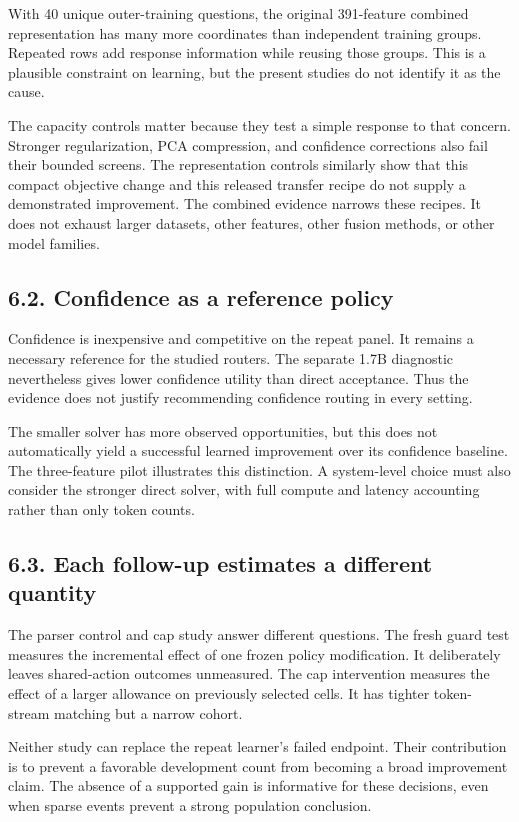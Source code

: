\documentclass[11pt,a4paper]{article}
\begin{document}
With 40 unique outer-training questions, the original 391-feature combined representation has many more coordinates than independent training groups. Repeated rows add response information while reusing those groups. This is a plausible constraint on learning, but the present studies do not identify it as the cause.

The capacity controls matter because they test a simple response to that concern. Stronger regularization, PCA compression, and confidence corrections also fail their bounded screens. The representation controls similarly show that this compact objective change and this released transfer recipe do not supply a demonstrated improvement. The combined evidence narrows these recipes. It does not exhaust larger datasets, other features, other fusion methods, or other model families.

\subsection*{6.2. Confidence as a reference policy}\label{sec:62-confidence-as-a-reference-policy}
Confidence is inexpensive and competitive on the repeat panel. It remains a necessary reference for the studied routers. The separate 1.7B diagnostic nevertheless gives lower confidence utility than direct acceptance. Thus the evidence does not justify recommending confidence routing in every setting.

The smaller solver has more observed opportunities, but this does not automatically yield a successful learned improvement over its confidence baseline. The three-feature pilot illustrates this distinction. A system-level choice must also consider the stronger direct solver, with full compute and latency accounting rather than only token counts.

\subsection*{6.3. Each follow-up estimates a different quantity}\label{sec:63-each-follow-up-estimates-a-different-quantity}
The parser control and cap study answer different questions. The fresh guard test measures the incremental effect of one frozen policy modification. It deliberately leaves shared-action outcomes unmeasured. The cap intervention measures the effect of a larger allowance on previously selected cells. It has tighter token-stream matching but a narrow cohort.

Neither study can replace the repeat learner's failed endpoint. Their contribution is to prevent a favorable development count from becoming a broad improvement claim. The absence of a supported gain is informative for these decisions, even when sparse events prevent a strong population conclusion.
\end{document}
